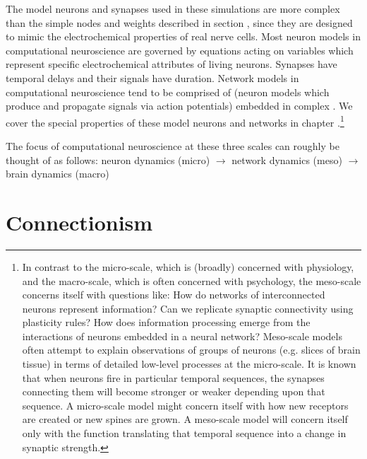 The model neurons and synapses used in these simulations are more complex than the simple nodes and weights described in section , since they are designed to mimic the electrochemical properties of real nerve cells. Most neuron models in computational neuroscience are governed by equations acting on variables which represent specific electrochemical attributes of living neurons. Synapses have temporal delays and their signals have duration. Network models in computational neuroscience tend to be comprised of  (neuron models which produce and propagate signals via action potentials) embedded in complex . We cover the special properties of these model neurons and networks in chapter .\footnote{In contrast to the micro-scale, which is (broadly) concerned with physiology, and the macro-scale, which is often concerned with psychology, the meso-scale concerns itself with questions like: How do networks of interconnected neurons represent information? Can we replicate synaptic connectivity using plasticity rules? How does information processing emerge from the interactions of neurons embedded in a neural network? Meso-scale models often attempt to explain observations of groups of neurons (e.g. slices of brain tissue) in terms of detailed low-level processes at the micro-scale. It is known that when neurons fire in particular temporal sequences, the synapses connecting them will become stronger or weaker depending upon that sequence. A micro-scale model might concern itself with how new receptors are created or new spines are grown. A meso-scale model will concern itself only with the function translating that temporal sequence into a change in synaptic strength.}

The focus of computational neuroscience at these three scales can roughly be thought of as follows:
neuron dynamics (micro) $\rightarrow$ network dynamics (meso) $\rightarrow$ brain dynamics (macro)

\section{Connectionism}\label{connectionism}


